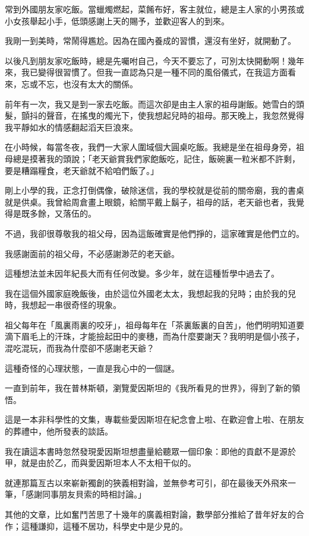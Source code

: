 \begin{acknowledgement}

常到外國朋友家吃飯。當蠟燭燃起，菜餚布好，客主就位，總是主人家的小男孩或小女孩舉起小手，低頭感謝上天的賜予，並歡迎客人的到來。

我剛一到美時，常鬧得尷尬。因為在國內養成的習慣，還沒有坐好，就開動了。

以後凡到朋友家吃飯時，總是先囑咐自己，今天不要忘了，可別太快開動啊！幾年來，我已變得很習慣了。但我一直認為只是一種不同的風俗儀式，在我這方面看來，忘或不忘，也沒有太大的關係。

前年有一次，我又是到一家去吃飯。而這次卻是由主人家的祖母謝飯。她雪白的頭髮，顫抖的聲音，在搖曳的燭光下，使我想起兒時的祖母。那天晚上，我忽然覺得我平靜如水的情感翻起滔天巨浪來。

在小時候，每當冬夜，我們一大家人圍域個大圓桌吃飯。我總是坐在祖母身旁，祖母總是摸著我的頭說；「老天爺賞我們家飽飯吃，記住，飯碗裏一粒米都不許剩，要是糟蹋糧食，老天爺就不給咱們飯了。」

剛上小學的我，正念打倒偶像，破除迷信，我的學校就是從前的關帝廟，我的書桌就是供桌。我曾給周倉畫上眼鏡，給關平戴上鬍子，祖母的話，老天爺也者，我覺得是既多餘，又落伍的。

不過，我卻很尊敬我的祖父母，因為這飯確實是他們掙的，這家確實是他們立的。

我感謝面前的祖父母，不必感謝渺茫的老天爺。

這種想法並未因年紀長大而有任何改變。多少年，就在這種哲學中過去了。

我在這個外國家庭晚飯後，由於這位外國老太太，我想起我的兒時；由於我的兒時，我想起一串很奇怪的現象。

祖父每年在「風裏雨裏的咬牙」，祖母每年在「茶裏飯裏的自苦」，他們明明知道要滴下眉毛上的汗珠，才能撿起田中的麥穗，而為什麼要謝天？我明明是個小孩子，混吃混玩，而我為什麼卻不感謝老天爺？

這種奇怪的心理狀態，一直是我心中的一個謎。

一直到前年，我在普林斯頓，瀏覽愛因斯坦的《我所看見的世界》，得到了新的領悟。

這是一本非科學性的文集，專載些愛因斯坦在紀念會上啦、在歡迎會上啦、在朋友的葬禮中，他所發表的談話。

我在讀這本書時忽然發現愛因斯坦想盡量給聽眾一個印象：即他的貢獻不是源於甲，就是由於乙，而與愛因斯坦本人不太相干似的。

就連那篇亙古以來嶄新獨創的狹義相對論，並無參考可引，卻在最後天外飛來一筆，「感謝同事朋友貝索的時相討論。」

其他的文章，比如奮鬥苦思了十幾年的廣義相對論，數學部分推給了昔年好友的合作；這種謙抑，這種不居功，科學史中是少見的。


\end{acknowledgement}
